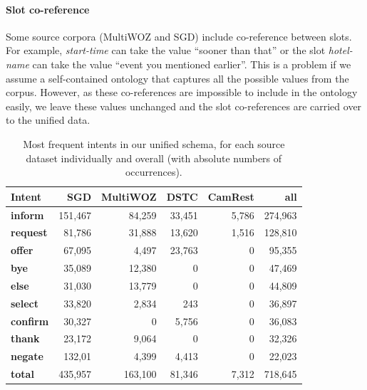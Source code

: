 \paragraph{Slot co-reference}
Some source corpora (MultiWOZ and SGD) include co-reference between slots.
For example, \textit{start-time} can take the value “sooner than that” or the slot \emph{hotel-name} can take the value “event you mentioned earlier”.
This is a problem if we assume a self-contained ontology that captures all the possible values from the corpus.
However, as these co-references are impossible to include in the ontology easily, we leave these values unchanged and the slot co-references are carried over to the unified data.

\begin{table}[tp]
    \centering\footnotesize
    \begin{tabular}{l>{\hspace{-3mm}}r>{\hspace{-2mm}}rrr>{\hspace{-2mm}}r}
        \toprule
        \bf Intent &
        \textbf{SGD} & 
        \textbf{MultiWOZ} &
        \textbf{DSTC} &
        \textbf{CamRest} &
         \textbf{all}\\ \midrule
        \textbf{inform} & 151,467 & 84,259 & 33,451 & 5,786 & 274,963\\ 
        \textbf{request} & 81,786 & 31,888 & 13,620 & 1,516 & 128,810\\ 
        \textbf{offer} & 67,095 & 4,497 & 23,763 & 0 & 95,355\\ 
        \textbf{bye} & 35,089 & 12,380 & 0 & 0 & 47,469\\ 
        \textbf{else}& 31,030 & 13,779 & 0 & 0 & 44,809 \\ 
        \textbf{select}& 33,820 & 2,834 & 243 & 0 & 36,897\\ 
        \textbf{confirm}& 30,327 & 0 & 5,756 & 0 & 36,083\\
        \textbf{thank}& 23,172 & 9,064 & 0 & 0 & 32,326\\ 
        \textbf{negate}& 132,01 & 4,399 & 4,413 & 0 & 22,023\\ 
        \midrule
        \textbf{total}& 435,957 & 163,100 & 81,346 & 7,312 & 718,645\\
        \bottomrule
    \end{tabular}
    \caption{Most frequent intents in our unified schema, for each source dataset individually and overall (with absolute numbers of occurrences).}
    \label{tab:intents}
\end{table}

